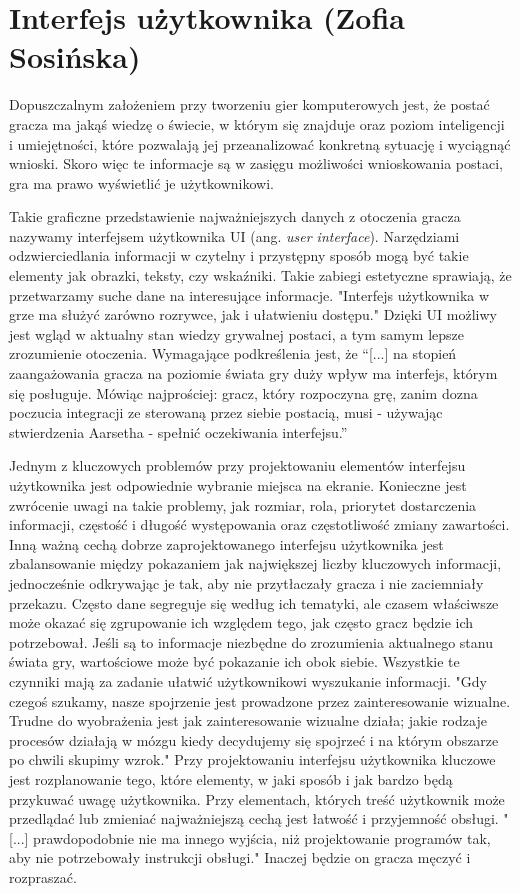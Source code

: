 \section{Interfejs użytkownika (Zofia Sosińska)}\label{c:elem_ui}

Dopuszczalnym założeniem przy tworzeniu gier komputerowych jest, że postać gracza ma jakąś wiedzę o świecie, w którym się znajduje oraz
poziom inteligencji i umiejętności, które pozwalają jej przeanalizować konkretną sytuację i wyciągnąć wnioski. Skoro więc te informacje są w zasięgu możliwości wnioskowania postaci, gra ma prawo wyświetlić je użytkownikowi. 

Takie graficzne przedstawienie najważniejszych danych z otoczenia gracza nazywamy interfejsem użytkownika UI (ang. \textit{user interface}). Narzędziami odzwierciedlania informacji
w czytelny i przystępny sposób mogą być takie elementy jak obrazki, teksty, czy wskaźniki. Takie zabiegi estetyczne sprawiają, że przetwarzamy suche dane
na interesujące informacje. "Interfejs użytkownika w grze ma służyć zarówno rozrywce, jak i ułatwieniu dostępu."\cite{projektowanie_podstawy}
Dzięki UI możliwy jest wgląd w aktualny stan wiedzy grywalnej postaci, a tym samym lepsze
zrozumienie otoczenia. Wymagające podkreślenia jest, że “[...] na stopień zaangażowania gracza na poziomie świata gry duży wpływ ma interfejs, którym się posługuje. Mówiąc najprościej:
gracz, który rozpoczyna grę, zanim dozna poczucia integracji ze sterowaną przez siebie postacią, musi - używając stwierdzenia Aarsetha - spełnić oczekiwania interfejsu.”\cite{olbrzymwcieniu}

Jednym z kluczowych problemów przy projektowaniu elementów interfejsu użytkownika jest odpowiednie wybranie miejsca na ekranie. Konieczne jest zwrócenie uwagi na takie 
problemy, jak  rozmiar, rola, priorytet dostarczenia informacji, częstość i długość występowania oraz częstotliwość zmiany zawartości.
Inną ważną cechą dobrze zaprojektowanego interfejsu użytkownika jest zbalansowanie między pokazaniem jak największej liczby kluczowych informacji, 
jednocześnie odkrywając je tak, aby nie przytłaczały gracza i nie zaciemniały przekazu.
Często dane segreguje się według ich tematyki, ale czasem właściwsze może okazać się zgrupowanie ich 
względem tego, jak często gracz będzie ich potrzebował. Jeśli są to informacje niezbędne do zrozumienia aktualnego 
stanu świata gry, wartościowe może być pokazanie ich obok siebie. Wszystkie te czynniki mają za zadanie ułatwić użytkownikowi
wyszukanie informacji. "Gdy czegoś szukamy, nasze spojrzenie jest prowadzone przez zainteresowanie wizualne.
Trudne do wyobrażenia jest jak zainteresowanie wizualne działa; jakie rodzaje procesów działają w mózgu kiedy decydujemy się spojrzeć i na
którym obszarze po chwili skupimy wzrok."\cite{user_interfaces} Przy projektowaniu interfejsu użytkownika kluczowe jest rozplanowanie
tego, które elementy, w jaki sposób i jak bardzo będą przykuwać uwagę użytkownika. Przy elementach, których treść użytkownik może przedlądać
lub zmieniać najważniejszą cechą jest łatwość i przyjemność obsługi. "[...] prawdopodobnie nie ma innego wyjścia, niż projektowanie programów tak,
 aby nie potrzebowały instrukcji obsługi."\cite{ui_for_programmers} Inaczej będzie on gracza męczyć i rozpraszać.

